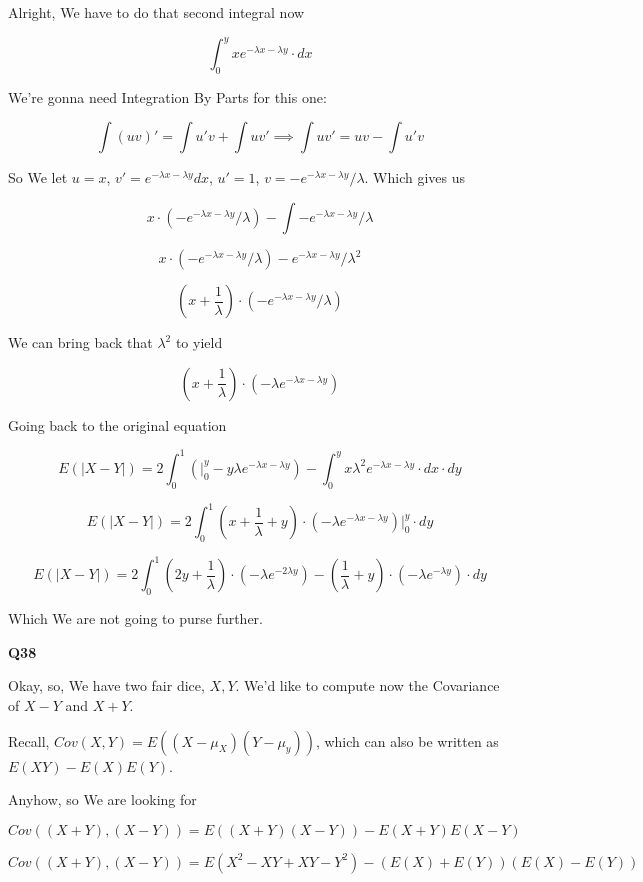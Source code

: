 \documentclass{article}
\begin{document}
			Alright, We have to do that second integral now
			
			\[ \int^y_0 xe^{-\lambda x - \lambda y} \cdot dx \]
			
			We're gonna need Integration By Parts for this one:
			
			\[ \int (uv)' = \int u'v + \int uv' \implies \int uv' = uv - \int u'v \]
			
			So We let $u = x$, $v' = e^{-\lambda x - \lambda y} dx$, $u' = 1$, $v = -e^{-\lambda x - \lambda y}/\lambda$. Which gives us 
			
			\[ x\cdot (-e^{-\lambda x - \lambda y}/\lambda) - \int -e^{-\lambda x - \lambda y}/\lambda  \]
			
			\[ x\cdot (-e^{-\lambda x - \lambda y}/\lambda) - e^{-\lambda x - \lambda y}/\lambda^2  \]
			
			\[ \left(x + \frac{1}{\lambda}\right) \cdot (-e^{-\lambda x - \lambda y}/\lambda)   \]
			
			We can bring back that $\lambda^2$ to yield
			
			\[ \left(x + \frac{1}{\lambda}\right) \cdot (-\lambda e^{-\lambda x - \lambda y})   \]
			
			Going back to the original equation
						
			\[ E(|X-Y|) = 2\int^1_0 \left(\bigg|^y_0 -y\lambda e^{-\lambda x - \lambda y}\right) - \int^y_0 x\lambda^2 e^{-\lambda x - \lambda y} \cdot dx \cdot dy \]
						
			\[ E(|X-Y|) = 2\int^1_0 \left(x + \frac{1}{\lambda} + y \right) \cdot (-\lambda e^{-\lambda x - \lambda y})\bigg|^y_0 \cdot dy \]
			
			\[ E(|X-Y|) = 2\int^1_0 \left(2y + \frac{1}{\lambda} \right) \cdot (-\lambda e^{-2\lambda y}) - \left(\frac{1}{\lambda} + y \right) \cdot (-\lambda e^{- \lambda y}) \cdot dy \]
			
			Which We are not going to purse further.
			
		\textbf{Q38}
		
			Okay, so, We have two fair dice, $X, Y$. We'd like to compute now the Covariance of $X-Y$ and $X+Y$.
			
			Recall, $Cov(X, Y) = E((X-\mu_X)(Y-\mu_y))$, which can also be written as $E(XY) - E(X)E(Y)$.

			Anyhow, so We are looking for 
			
			\[ Cov((X+Y), (X-Y)) = E((X+Y)(X-Y)) - E(X+Y)E(X-Y) \]
			
			\[ Cov((X+Y), (X-Y)) = E(X^2-XY+XY-Y^2) - (E(X)+E(Y))(E(X)-E(Y)) \]
			
\end{document}
